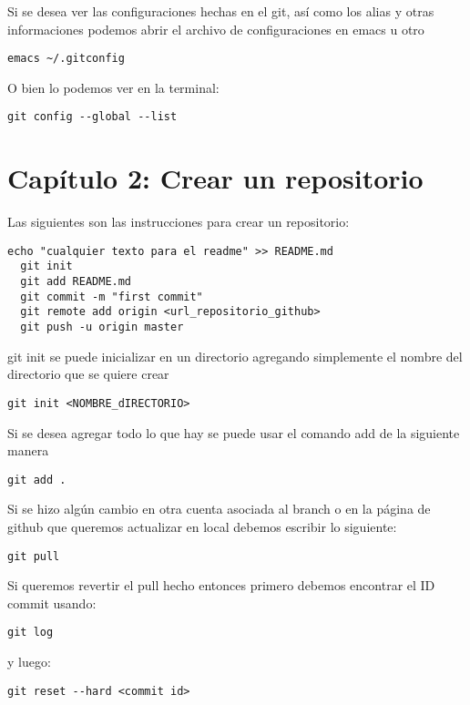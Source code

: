 Si se desea ver las configuraciones hechas en el git, as\'i como los alias y otras informaciones podemos abrir el archivo de configuraciones en emacs u otro

\begin{lstlisting}[numbers=none]
  emacs ~/.gitconfig
\end{lstlisting}

O bien lo podemos ver en la terminal:


\begin{lstlisting}[numbers=none]
  git config --global --list
\end{lstlisting}

\section{Cap\'itulo 2: Crear un repositorio}

Las siguientes son las instrucciones para crear un repositorio:


\begin{lstlisting}[numbers=none]
  echo "cualquier texto para el readme" >> README.md
  git init
  git add README.md
  git commit -m "first commit"
  git remote add origin <url_repositorio_github>
  git push -u origin master
\end{lstlisting}

git init se puede inicializar en un directorio agregando simplemente el nombre del directorio que se quiere crear


\begin{lstlisting}[numbers=none]
  git init <NOMBRE_dIRECTORIO>
\end{lstlisting}

Si se desea agregar todo lo que hay se puede usar el comando add de la siguiente manera


\begin{lstlisting}[numbers=none]
  git add .
\end{lstlisting}

Si se hizo alg\'un cambio en otra cuenta asociada al branch o en la p\'agina de github que queremos actualizar en local debemos escribir lo siguiente:


\begin{lstlisting}[numbers=none]
  git pull
\end{lstlisting}

Si queremos revertir el pull hecho entonces primero debemos encontrar el ID commit usando:
\begin{lstlisting}[numbers=none]
  git log
\end{lstlisting}

y luego:
\begin{lstlisting}[numbers=none]
  git reset --hard <commit id>
\end{lstlisting}
